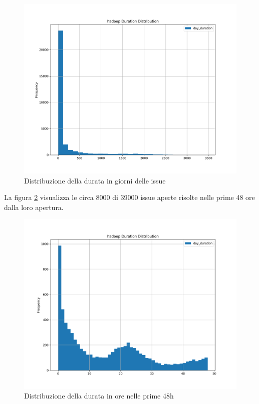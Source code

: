 \documentclass[%
    corpo=12pt,
    twoside,
    oldstyle,
    autoretitolo,
    greek,
    evenboxes,
]{toptesi}
\begin{document}
\begin{figure}[!ht]
  \includegraphics[width=\linewidth]{figure/day_duration.png}
  \caption{Distribuzione della durata in giorni delle issue}
  \label{fig:day_duration}
\end{figure}
La figura \ref{fig:d48h_duration} visualizza le circa 8000 di 39000 issue aperte risolte nelle prime 48 ore dalla loro apertura.
\begin{figure}[!ht]
  \includegraphics[width=\linewidth]{figure/48h_duration.png}
  \caption{Distribuzione della durata in ore nelle prime 48h}
  \label{fig:d48h_duration}
\end{figure}
\end{document}
